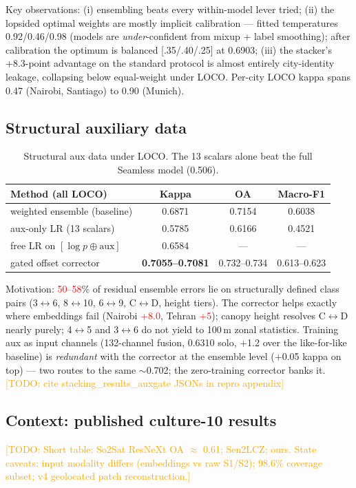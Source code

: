 \documentclass[11pt]{article}
\newif\ifverified
\newcommand{\uv}[1]{\ifverified#1\else\textcolor{red}{#1}\fi}
\newcommand{\todo}[1]{\textcolor{orange}{[TODO: #1]}}
\begin{document}
Key observations: (i) ensembling beats every within-model lever
tried; (ii) the lopsided optimal weights are mostly implicit
calibration --- fitted temperatures 0.92/0.46/0.98
(models are \emph{under}-confident from mixup + label smoothing);
after calibration the optimum is balanced [.35/.40/.25] at
0.6903; (iii) the stacker's +8.3-point advantage on the
standard protocol is almost entirely city-identity leakage,
collapsing below equal-weight under LOCO. Per-city LOCO kappa spans
0.47 (Nairobi, Santiago) to 0.90 (Munich).

\subsection{Structural auxiliary data}\label{sec:results-aux}
\begin{table}[h]
\centering\small
\begin{tabular}{lccc}
\toprule
Method (all LOCO) & Kappa & OA & Macro-F1\\
\midrule
weighted ensemble (baseline) & 0.6871 & 0.7154 & 0.6038\\
aux-only LR (13 scalars) & 0.5785 & 0.6166 & 0.4521\\
free LR on $[\log p \oplus \text{aux}]$ & 0.6584 & --- & ---\\
gated offset corrector & \textbf{0.7055--0.7081} & 0.732--0.734 & 0.613--0.623\\
\bottomrule
\end{tabular}
\caption{Structural aux data under LOCO. The 13 scalars alone beat
the full Seamless model (0.506).}
\label{tab:aux}
\end{table}

Motivation: \uv{50--58}\% of residual ensemble errors lie on
structurally defined class pairs (3$\leftrightarrow$6,
8$\leftrightarrow$10, 6$\leftrightarrow$9, C$\leftrightarrow$D,
height tiers). The corrector helps exactly where embeddings fail
(Nairobi \uv{+8.0}, Tehran \uv{+5}); canopy height resolves
C$\leftrightarrow$D nearly purely; 4$\leftrightarrow$5 and
3$\leftrightarrow$6 do not yield to 100\,m zonal statistics.
Training aux as input channels (132-channel fusion,
0.6310 solo, +1.2 over the like-for-like baseline) is \emph{redundant} with
the corrector at the ensemble level (+0.05 kappa on top) ---
two routes to the same $\sim$0.702; the zero-training corrector
banks it. \todo{cite stacking\_results\_auxgate JSONs in repro
appendix}

\subsection{Context: published culture-10 results}
\label{sec:results-context}
\todo{Short table: So2Sat ResNeXt OA $\approx$ 0.61; Sen2LCZ; ours.
State caveats: input modality differs (embeddings vs raw S1/S2);
98.6\% coverage subset; v4 geolocated patch reconstruction.}
\end{document}
